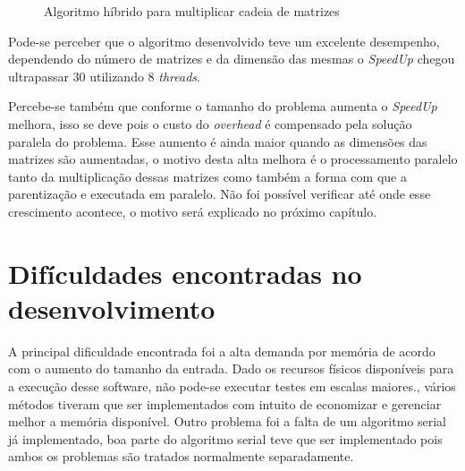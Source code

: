 \documentclass[12pt,openright,oneside,chapter=TITLE,section=TITLE,
    brazil]{utfpr-pg}
\begin{document}
\begin{figure}[h]
	\centering	
	{%
		\setlength{\fboxsep}{0pt}%
		\setlength{\fboxrule}{1pt}%
	}%
	\vspace{-0.3cm}
	\caption{Algoritmo híbrido para multiplicar cadeia de matrizes} \label{fig:total}
\end{figure}

Pode-se perceber que o algoritmo desenvolvido teve um excelente desempenho, dependendo do número de matrizes e da dimensão das mesmas o \emph{SpeedUp} chegou ultrapassar 30 utilizando 8 \emph{threads}.

Percebe-se também que conforme o tamanho do problema aumenta o \emph{SpeedUp} melhora, isso se deve pois o custo do \emph{overhead} é compensado pela solução paralela do problema. Esse aumento é ainda maior quando as dimensões das matrizes são aumentadas, o motivo desta alta melhora é o processamento paralelo tanto da multiplicação dessas matrizes como também a forma com que a parentização e executada em paralelo. Não foi possível verificar até onde esse crescimento acontece, o motivo será explicado no próximo capítulo.

\vspace{1cm}
{\let\clearpage\relax \chapter{Difículdades encontradas no desenvolvimento}}
\vspace{-0.7cm}

A principal dificuldade encontrada foi a alta demanda por memória de acordo com o aumento do tamanho da entrada. Dado os recursos físicos disponíveis para a execução desse software, não pode-se executar testes em escalas maiores., vários métodos tiveram que ser implementados com intuito de economizar e gerenciar melhor a memória disponível. Outro problema foi a falta de um algoritmo serial já implementado, boa parte do algoritmo serial teve que ser implementado pois ambos os problemas são tratados normalmente separadamente.
\end{document}

